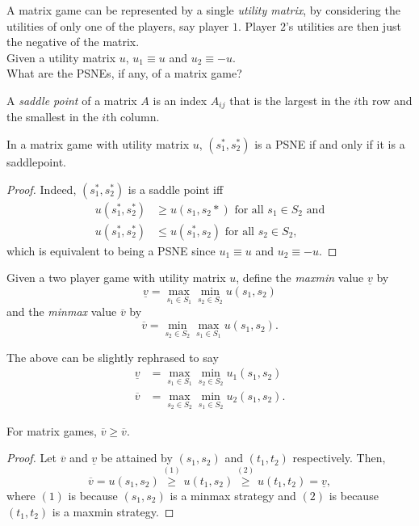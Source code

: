 	A matrix game can be represented by a single \emph{utility matrix}, by considering the utilities of only one of the players, say player $1$. Player $2$'s utilities are then just the negative of the matrix.\\
	Given a utility matrix $u$, $u_1 \equiv u$ and $u_2 \equiv -u$.\\

	What are the PSNEs, if any, of a matrix game?

	\begin{definition}
		A \emph{saddle point} of a matrix $A$ is an index $A_{ij}$ that is the largest in the $i$th row and the smallest in the $i$th column.
	\end{definition}

	\begin{ftheo}
		In a matrix game with utility matrix $u$, $(s_1^*,s_2^*)$ is a PSNE if and only if it is a saddlepoint.
	\end{ftheo}
	\begin{proof}
		Indeed, $(s_1^*,s_2^*)$ is a saddle point iff
		\begin{align*}
			u(s_1^*,s_2^*) &\ge u(s_1,s_2*) \text{ for all $s_1 \in S_2$ and} \\
			u(s_1^*,s_2^*) &\le u(s_1^*,s_2) \text{ for all $s_2 \in S_2$,}
		\end{align*}
		which is equivalent to being a PSNE since $u_1 \equiv u$ and $u_2 \equiv -u$.
	\end{proof}

	\begin{fdef}
		Given a two player game with utility matrix $u$, define the \emph{maxmin} value $\underline{v}$ by
		\[ \underline{v} = \max_{s_1 \in S_1} \min_{s_2 \in S_2} u(s_1,s_2) \]
		and the \emph{minmax} value $\overline{v}$ by
		\[ \overline{v} = \min_{s_2 \in S_2} \max_{s_1 \in S_1} u(s_1,s_2). \]
	\end{fdef}

	The above can be slightly rephrased to say
	\begin{align*}
		\underline{v} &= \max_{s_1 \in S_1} \min_{s_2 \in S_2} u_1(s_1,s_2) \\
		\overline{v} &= \max_{s_2 \in S_2} \min_{s_1 \in S_2} u_2(s_1,s_2).
	\end{align*}

	\begin{flem}
		\label{lemma: minmax ge maxmin}
		For matrix games, $\overline{v} \ge \overline{v}$.
	\end{flem}
	\begin{proof}
		Let $\overline{v}$ and $\underline{v}$ be attained by $(s_1,s_2)$ and $(t_1,t_2)$ respectively. Then,
		\[ \overline{v} = u(s_1,s_2) \stackrel{(1)}{\ge} u(t_1,s_2) \stackrel{(2)}{\ge} u(t_1,t_2) = \underline{v}, \]
		where $(1)$ is because $(s_1,s_2)$ is a minmax strategy and $(2)$ is because $(t_1,t_2)$ is a maxmin strategy.
	\end{proof}

